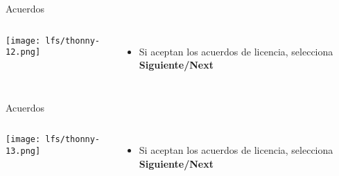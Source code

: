 \begin{frame}[c]{Acuerdos}
    \begin{columns}
        \begin{center}
            \texttt{[image: lfs/thonny-12.png]}
        \end{center}
        \begin{itemize}
          \item Si aceptan los acuerdos de licencia, selecciona
            \textbf{Siguiente/Next}
        \end{itemize}
    \end{columns}
\end{frame}

\begin{frame}[c]{Acuerdos}
    \begin{columns}
        \begin{center}
            \texttt{[image: lfs/thonny-13.png]}
        \end{center}
        \begin{itemize}
          \item Si aceptan los acuerdos de licencia, selecciona
            \textbf{Siguiente/Next}
        \end{itemize}
    \end{columns}
\end{frame}

